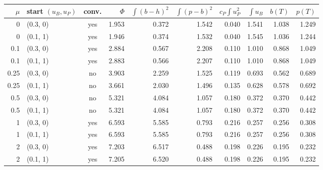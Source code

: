 \begin{tabular}{rlcrrrrrrr}
\toprule
$\mu$ & start $(u_B,u_P)$ & conv. & $\Phi$ & $\int(b-h)^2$ & $\int(p-b)^2$ & $c_P\!\int u_P^2$ & $\int u_B$ & $b(T)$ & $p(T)$\\
\midrule
0 & (0.3, 0) & yes & 1.953 & 0.372 & 1.542 & 0.040 & 1.541 & 1.038 & 1.249\\
0 & (0.1, 1) & yes & 1.946 & 0.374 & 1.532 & 0.040 & 1.545 & 1.036 & 1.244\\
0.1 & (0.3, 0) & yes & 2.884 & 0.567 & 2.208 & 0.110 & 1.010 & 0.868 & 1.049\\
0.1 & (0.1, 1) & yes & 2.883 & 0.566 & 2.207 & 0.110 & 1.010 & 0.868 & 1.049\\
0.25 & (0.3, 0) & no & 3.903 & 2.259 & 1.525 & 0.119 & 0.693 & 0.562 & 0.689\\
0.25 & (0.1, 1) & no & 3.661 & 2.030 & 1.496 & 0.135 & 0.628 & 0.578 & 0.692\\
0.5 & (0.3, 0) & no & 5.321 & 4.084 & 1.057 & 0.180 & 0.372 & 0.370 & 0.442\\
0.5 & (0.1, 1) & no & 5.321 & 4.084 & 1.057 & 0.180 & 0.372 & 0.370 & 0.442\\
1 & (0.3, 0) & yes & 6.593 & 5.585 & 0.793 & 0.216 & 0.257 & 0.256 & 0.308\\
1 & (0.1, 1) & yes & 6.593 & 5.585 & 0.793 & 0.216 & 0.257 & 0.256 & 0.308\\
2 & (0.3, 0) & yes & 7.203 & 6.517 & 0.488 & 0.198 & 0.226 & 0.195 & 0.232\\
2 & (0.1, 1) & yes & 7.205 & 6.520 & 0.488 & 0.198 & 0.226 & 0.195 & 0.232\\
\bottomrule
\end{tabular}
